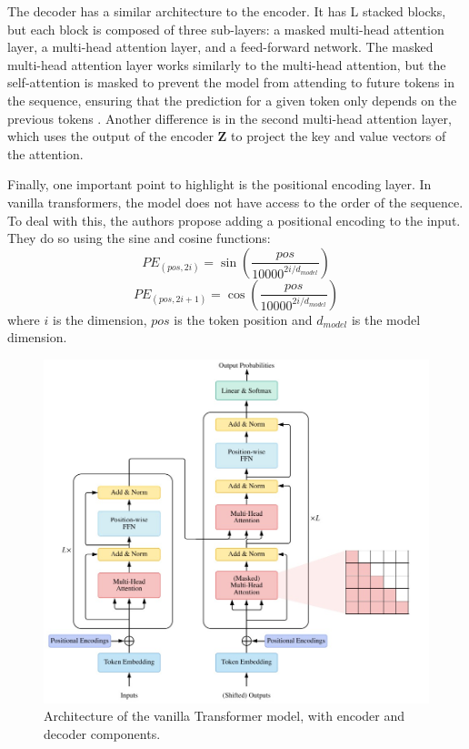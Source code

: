 The decoder has a similar architecture to the encoder. It has L stacked blocks, but each block is composed of three sub-layers: a masked multi-head attention layer, a multi-head attention layer, and a feed-forward network. The masked multi-head attention layer works similarly to the multi-head attention, but the self-attention is masked to prevent the model from attending to future tokens in the sequence, ensuring that the prediction for a given token only depends on the previous tokens \cite{lin2021surveytransformers}. Another difference is in the second multi-head attention layer, which uses the output of the encoder $\boldsymbol{Z}$ to project the key and value vectors of the attention.

Finally, one important point to highlight is the positional encoding layer. In vanilla transformers, the model does not have access to the order of the sequence. To deal with this, the authors propose adding a positional encoding to the input. They do so using the sine and cosine functions:
\begin{equation}
    PE_{(pos,2i)} = \sin\left(\frac{pos}{10000^{2i/d_{model}}}\right)
\end{equation}
\begin{equation}
    PE_{(pos,2i+1)} = \cos\left(\frac{pos}{10000^{2i/d_{model}}}\right)
\end{equation}
where $i$ is the dimension, $pos$ is the token position and $d_{model}$ is the model dimension.

\begin{figure}[H]
    \centering
    \includegraphics[width=12cm]{Cap2_LitReview/model_basics/Transformers/transformer_arch.png}
    \caption{Architecture of the vanilla Transformer model, with encoder and decoder components. \cite{lin2021surveytransformers}}
    \label{fig:Transformer-arch}
\end{figure}

